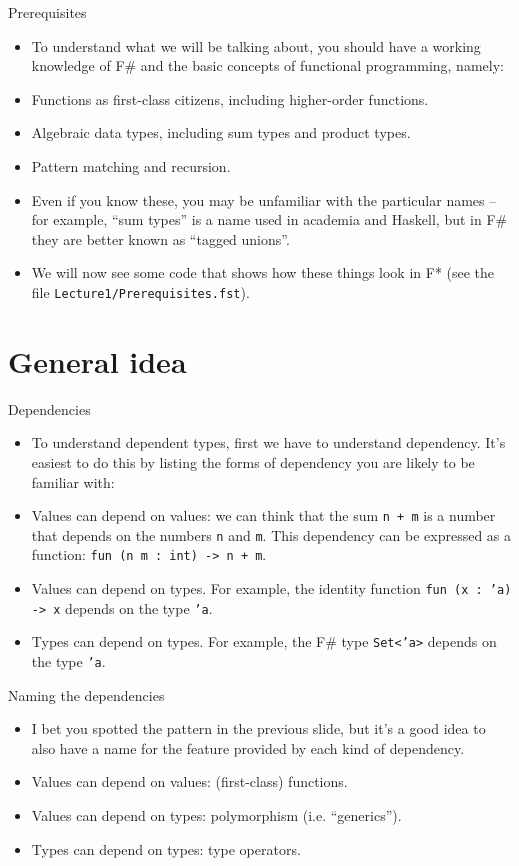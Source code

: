 \documentclass{beamer}
\newcommand{\m}[1]{\texttt{#1}}
\begin{document}
\begin{frame}{Prerequisites}
\begin{itemize}
	\item To understand what we will be talking about, you should have a working knowledge of F\# and the basic concepts of functional programming, namely:
	\item Functions as first-class citizens, including higher-order functions.
	\item Algebraic data types, including sum types and product types.
	\item Pattern matching and recursion.
	\item Even if you know these, you may be unfamiliar with the particular names -- for example, ``sum types'' is a name used in academia and Haskell, but in F\# they are better known as ``tagged unions''.
	\item We will now see some code that shows how these things look in F* (see the file \texttt{Lecture1/Prerequisites.fst}).
\end{itemize}
\end{frame}

\section{General idea}

\begin{frame}{Dependencies}
\begin{itemize}
	\item To understand dependent types, first we have to understand dependency. It's easiest to do this by listing the forms of dependency you are likely to be familiar with:
	\item Values can depend on values: we can think that the sum \m{n + m} is a number that depends on the numbers \m{n} and \m{m}. This dependency can be expressed as a function: \m{fun (n m :\ int) -> n + m}.
	\item Values can depend on types. For example, the identity function \m{fun (x :\ 'a) -> x} depends on the type \m{'a}.
	\item Types can depend on types. For example, the F\# type \m{Set<'a>} depends on the type \m{'a}.
\end{itemize}
\end{frame}

\begin{frame}{Naming the dependencies}
\begin{itemize}
	\item I bet you spotted the pattern in the previous slide, but it's a good idea to also have a name for the feature provided by each kind of dependency.
	\item Values can depend on values: (first-class) functions.
	\item Values can depend on types: polymorphism (i.e. ``generics'').
	\item Types can depend on types: type operators.
\end{itemize}
\end{frame}
\end{document}
